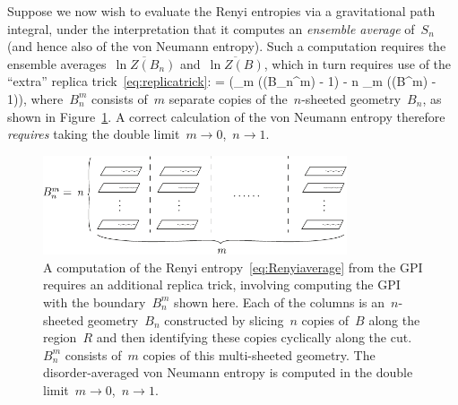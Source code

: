 \documentclass[12pt]{article}
\begin{document}
Suppose we now wish to evaluate the Renyi entropies via a gravitational path integral, under the interpretation that it computes an \textit{ensemble average} of~$S_n$ (and hence also of the von Neumann entropy).  Such a computation requires the ensemble averages~$\overline{\ln Z(B_n)}$ and~$\overline{\ln Z(B)}$, which in turn requires use of the ``extra'' replica trick~\eqref{eq:replicatrick}:
\be
\label{eq:Renyiaverage}
 =  \left(\lim_{m }  \left(\Pcal(B_n^m) - 1\right) - n \lim_{m }  \left(\Pcal(B^m) - 1\right)\right),
\ee
where~$B_n^m$ consists of~$m$ separate copies of the~$n$-sheeted geometry~$B_n$, as shown in Figure~\ref{fig:ManyReplicas}.  A correct calculation of the von Neumann entropy therefore \textit{requires} taking the double limit~$m \to 0$,~$n \to 1$.

\begin{figure}
\centering
\includegraphics[page=1,width=0.8\textwidth]{Figures-pics}
\caption{A computation of the Renyi entropy~\eqref{eq:Renyiaverage} from the GPI requires an additional replica trick, involving computing the GPI with the boundary~$B_n^m$ shown here.  Each of the columns is an~$n$-sheeted geometry~$B_n$ constructed by slicing~$n$ copies of~$B$ along the region~$R$ and then identifying these copies cyclically along the cut.  $B_n^m$ consists of~$m$ copies of this multi-sheeted geometry.  The disorder-averaged von Neumann entropy is computed in the double limit~$m \to 0$,~$n \to 1$.}
\label{fig:ManyReplicas}
\end{figure}
\end{document}
